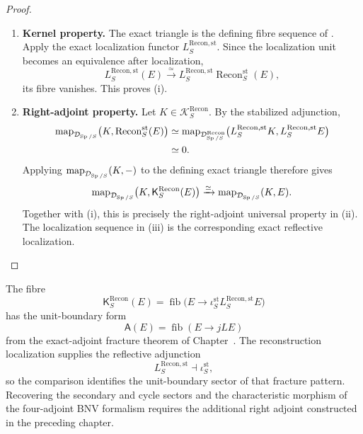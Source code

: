 \begin{proof}
\leavevmode
\begin{enumerate}[label=\textup{(\arabic*)}]
    \item \textbf{Kernel property.}
    The exact triangle is the defining fibre sequence of
    . Apply the exact localization functor
    \(L^{\mathrm{Recon},\mathrm{st}}_S\). Since the localization unit becomes an
    equivalence after localization,
    \[
        L^{\mathrm{Recon},\mathrm{st}}_S(E)
        \xrightarrow{\simeq}
        L^{\mathrm{Recon},\mathrm{st}}_S
        \operatorname{Recon}^{\mathrm{st}}_S(E),
    \]
    its fibre vanishes. This proves \textup{(i)}.
    \item \textbf{Right-adjoint property.}
    Let \(K\in\mathcal K^{\mathrm{Recon}}_S\). By the stabilized adjunction,
    \[
    \begin{aligned}
        \operatorname{map}_{\mathcal D_{\operatorname{Sp}/S}}
        \bigl(
            K,
            \operatorname{Recon}^{\mathrm{st}}_S(E)
        \bigr)
        &\simeq
        \operatorname{map}_{\mathcal D^{\mathrm{Recon}}_{\operatorname{Sp}/S}}
        \bigl(
            L^{\mathrm{Recon},\mathrm{st}}_S K,
            L^{\mathrm{Recon},\mathrm{st}}_S E
        \bigr)
        \\
        &\simeq0.
    \end{aligned}
    \]
    Applying \(\operatorname{map}_{\mathcal D_{\operatorname{Sp}/S}}(K,-)\) to the defining exact triangle therefore
    gives
    \[
        \operatorname{map}_{\mathcal D_{\operatorname{Sp}/S}}
        \bigl(K,\mathsf K^{\mathrm{Recon}}_S(E)\bigr)
        \xrightarrow{\simeq}
        \operatorname{map}_{\mathcal D_{\operatorname{Sp}/S}}(K,E).
    \]
    Together with \textup{(i)}, this is precisely the right-adjoint universal
    property in \textup{(ii)}. The localization sequence in \textup{(iii)} is the
    corresponding exact reflective localization.
\end{enumerate}
\end{proof}

\begin{remark}
\label{rem:stable-reconstruction-defect-bnv}
The fibre
\[
    \mathsf K^{\mathrm{Recon}}_S(E)
    =
    \operatorname{fib}
    \bigl(
        E\to
        \iota^{\mathrm{st}}_SL^{\mathrm{Recon},\mathrm{st}}_SE
    \bigr)
\]
has the unit-boundary form
\[
    \mathsf A(E)=\operatorname{fib}(E\to jLE)
\]
from the exact-adjoint fracture theorem of
Chapter~. The reconstruction
localization supplies the reflective adjunction
\[
    L^{\mathrm{Recon},\mathrm{st}}_S
    \dashv
    \iota^{\mathrm{st}}_S,
\]
so the comparison identifies the unit-boundary sector of that fracture
pattern. Recovering the secondary and cycle sectors and the characteristic
morphism of the four-adjoint BNV formalism requires the additional right
adjoint constructed in the preceding chapter.
\end{remark}



